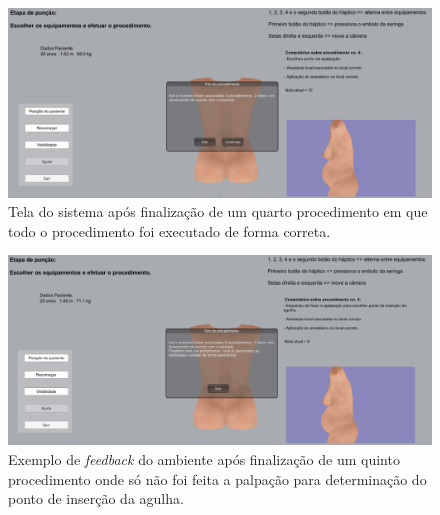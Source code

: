 \begin{figure}[ht!]
    \centering
    \includegraphics[width=\textwidth]{capitulos/figuras/sistema-exemplo-execucao-procedimento-4.png} 
    \caption{Tela do sistema após finalização de um quarto procedimento em que todo o procedimento foi executado de forma correta.}
    \label{fig:sistemaExecucao4correto}
\end{figure}

\begin{figure}[ht!]
    \centering
    \includegraphics[width=\textwidth]{capitulos/figuras/sistema-exemplo-execucao-procedimento-5.png} 
    \caption{Exemplo de \textit{feedback} do ambiente após finalização de um quinto procedimento onde só não foi feita a palpação para determinação do ponto de inserção da agulha.}
    \label{fig:sistemaExecucao5semApalpacaoCorreto}
\end{figure}

